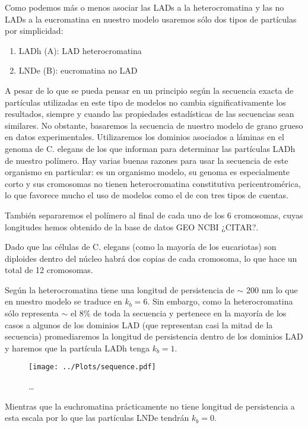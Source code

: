 Como podemos más o menos asociar las LADs a la heterocromatina y las no LADs a la eucromatina \cite{Bajpai2021} en nuestro modelo usaremos sólo dos tipos de partículas por simplicidad:
\begin{enumerate}
    \item LADh (A): LAD heterocromatina
    \item LNDe (B): eucromatina no LAD
\end{enumerate}

A pesar de lo que se pueda pensar en un principio según \cite{Bajpai2021} la secuencia exacta de partículas utilizadas en este tipo de modelos no cambia significativamente los resultados, siempre y cuando las propiedades estadísticas de las secuencias sean similares. No obstante, basaremos la secuencia de nuestro modelo de grano grueso en datos experimentales. Utilizaremos los dominios asociados a láminas en el genoma de C. elegans de los que informan \cite{Ho2014} para determinar las partículas LADh de nuestro polímero. Hay varias buenas razones para usar la secuencia de este organismo en particular: es un organismo modelo, su genoma es especialmente corto y sus cromosomas no tienen heterocromatina constitutiva pericentromérica, lo que favorece mucho el uso de modelos como el de \cite{Falk2019} con tres tipos de cuentas.

También separaremos el polímero al final de cada uno de los 6 cromosomas, cuyas longitudes hemos obtenido de la base de datos GEO NCBI ¿CITAR?.

Dado que las células de C. elegans (como la mayoría de los eucariotas) son diploides dentro del núcleo habrá dos copias de cada cromosoma, lo que hace un total de 12 cromosomas.

Según \cite{Bystricky2004} la heterocromatina tiene una longitud de persistencia de $\sim$ 200 nm lo que en nuestro modelo se traduce en $k_b=6$. Sin embargo, como la heterocromatina sólo representa $\sim$ el 8\% de toda la secuencia y pertenece en la mayoría de los casos a algunos de los dominios LAD (que representan casi la mitad de la secuencia) promediaremos la longitud de persistencia dentro de los dominios LAD y haremos que la partícula LADh tenga $k_b=1$.

\begin{figure}
    \centering
    \texttt{[image: ../Plots/sequence.pdf]}
    \caption{\dots}
    \label{fig:sequence}
\end{figure}

Mientras que la euchromatina prácticamente no tiene longitud de persistencia a esta escala por lo que las partículas LNDe tendrán $k_b=0$.


